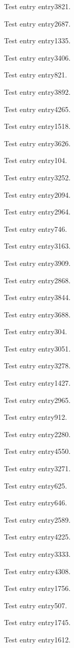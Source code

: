 Test entry \gls{entry3821}.

Test entry \gls{entry2687}.

Test entry \gls{entry1335}.

Test entry \gls{entry3406}.

Test entry \gls{entry821}.

Test entry \gls{entry3892}.

Test entry \gls{entry4265}.

Test entry \gls{entry1518}.

Test entry \gls{entry3626}.

Test entry \gls{entry104}.

Test entry \gls{entry3252}.

Test entry \gls{entry2094}.

Test entry \gls{entry2964}.

Test entry \gls{entry746}.

Test entry \gls{entry3163}.

Test entry \gls{entry3909}.

Test entry \gls{entry2868}.

Test entry \gls{entry3844}.

Test entry \gls{entry3688}.

Test entry \gls{entry304}.

Test entry \gls{entry3051}.

Test entry \gls{entry3278}.

Test entry \gls{entry1427}.

Test entry \gls{entry2965}.

Test entry \gls{entry912}.

Test entry \gls{entry2280}.

Test entry \gls{entry4550}.

Test entry \gls{entry3271}.

Test entry \gls{entry625}.

Test entry \gls{entry646}.

Test entry \gls{entry2589}.

Test entry \gls{entry4225}.

Test entry \gls{entry3333}.

Test entry \gls{entry4308}.

Test entry \gls{entry1756}.

Test entry \gls{entry507}.

Test entry \gls{entry1745}.

Test entry \gls{entry1612}.

